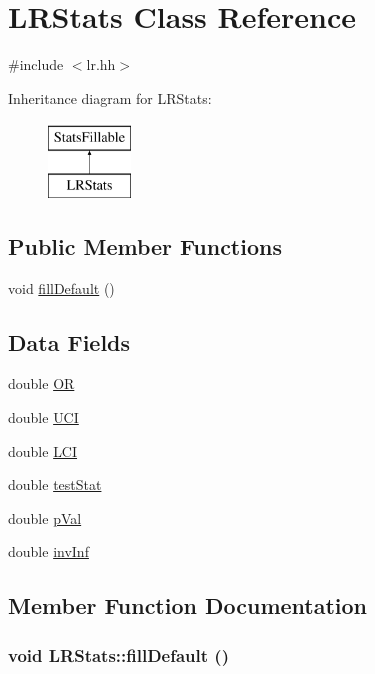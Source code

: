 \hypertarget{classLRStats}{
\section{LRStats Class Reference}
\label{classLRStats}
}


{\ttfamily \#include $<$lr.hh$>$}

Inheritance diagram for LRStats:\begin{figure}[H]
\begin{center}
\leavevmode
\includegraphics[height=2cm]{classLRStats}
\end{center}
\end{figure}
\subsection*{Public Member Functions}
\begin{DoxyCompactItemize}
\item 
void \hyperlink{classLRStats_a42f08be70d011bef6da77f20ffc999fe}{fillDefault} ()
\end{DoxyCompactItemize}
\subsection*{Data Fields}
\begin{DoxyCompactItemize}
\item 
double \hyperlink{classLRStats_ad2dc69ad8ef363196f7e1eb518d2749f}{OR}
\item 
double \hyperlink{classLRStats_a732a4d2d532d710c0eebbd55a5ea1cd4}{UCI}
\item 
double \hyperlink{classLRStats_a7a5645105fa178c1ae07ea41ce7265a7}{LCI}
\item 
double \hyperlink{classLRStats_a56946d63e769f7028683ce7899edd568}{testStat}
\item 
double \hyperlink{classLRStats_ab9c060dd747842d661d3ac3d3e7e7d8a}{pVal}
\item 
double \hyperlink{classLRStats_ad381b8b63712614b6d5cbdc46fdaf74f}{invInf}
\end{DoxyCompactItemize}


\subsection{Member Function Documentation}
\hypertarget{classLRStats_a42f08be70d011bef6da77f20ffc999fe}{
\subsubsection[{fillDefault}]{\setlength{\rightskip}{0pt plus 5cm}void LRStats::fillDefault ()}}
\label{classLRStats_a42f08be70d011bef6da77f20ffc999fe}


